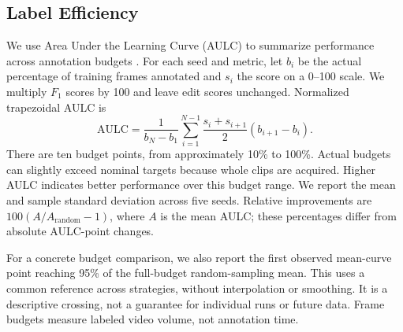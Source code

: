 \subsection{Label Efficiency}
We use Area Under the Learning Curve (AULC) to summarize performance across annotation budgets \autocite{settles_analysis_2008,giancola_towards_2023}. For each seed and metric, let $b_i$ be the actual percentage of training frames annotated and $s_i$ the score on a 0--100 scale. We multiply $F_1$ scores by 100 and leave edit scores unchanged. Normalized trapezoidal AULC is
\begin{equation}
    \mathrm{AULC}=\frac{1}{b_N-b_1}\sum_{i=1}^{N-1}
        \frac{s_i+s_{i+1}}{2}(b_{i+1}-b_i).
\end{equation}
There are ten budget points, from approximately 10\% to 100\%. Actual budgets can slightly exceed nominal targets because whole clips are acquired. Higher AULC indicates better performance over this budget range. We report the mean and sample standard deviation across five seeds. Relative improvements are $100(A/A_{\mathrm{random}}-1)$, where $A$ is the mean AULC; these percentages differ from absolute AULC-point changes.

For a concrete budget comparison, we also report the first observed mean-curve point reaching 95\% of the full-budget random-sampling mean. This uses a common reference across strategies, without interpolation or smoothing. It is a descriptive crossing, not a guarantee for individual runs or future data. Frame budgets measure labeled video volume, not annotation time.
